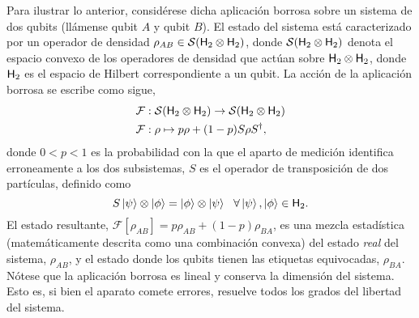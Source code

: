 \documentclass[onecolumn,11pt]{article}
\newcommand{\mcS}{\mathcal{S}}
\newcommand{\hilbert}{{\sf H}}
\newcommand{\mcF}{\mathcal{F}}
\newcommand{\Fuzzy}[1]{\mcF\left[#1\right]}
\begin{document}
Para ilustrar lo anterior, considérese dicha aplicación borrosa sobre un sistema de dos qubits (llámense qubit $A$ y qubit $B$). El estado del sistema está caracterizado por un operador de densidad $\rho_{AB} \in \mcS(\hilbert_2 \otimes \hilbert_2)$, donde $\mcS(\hilbert_2 \otimes \hilbert_2)$ denota el espacio convexo de los operadores de densidad que actúan sobre $\hilbert_2 \otimes \hilbert_2$, donde $\hilbert_2$ es el espacio de Hilbert correspondiente a un qubit. La acción de la aplicación borrosa se escribe como sigue,
\begin{align}
\mcF&:\mcS(\hilbert_2 \otimes \hilbert_2)\to \mcS(\hilbert_2 \otimes \hilbert_2)\nonumber\\
\mcF&: \rho \mapsto p\rho+(1-p)S\rho S^{\dag}\label{eq:Fuzzy2},
\end{align}
donde $0<p<1$ es la probabilidad con la que el aparto de medición identifica erroneamente a los dos subsistemas, $S$ es el operador de transposición de dos partículas, definido como 
$$S\ket{\psi}\otimes \ket{\phi}=\ket{\phi}\otimes \ket{\psi} \ \ \forall \ket{\psi},\ket{\phi}\in \hilbert_2.$$
%
El estado resultante, $\Fuzzy{\rho_{AB}}=p\rho_{AB}+(1-p)\rho_{BA}$, es una mezcla estadística (matemáticamente descrita como una combinación convexa) del estado \textit{real} del sistema, $\rho_{AB}$, y el estado donde los qubits tienen las etiquetas equivocadas, $\rho_{BA}$. Nótese que la aplicación borrosa es lineal y conserva la dimensión del sistema. Esto es, si bien el aparato comete errores, resuelve todos los grados del libertad del sistema.
\end{document}
